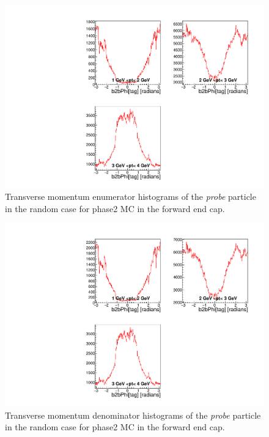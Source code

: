 \documentclass[a4paper,11pt,twosided,final,german,openbib,pdftex,listof=totoc,bibliography=totoc]{scrbook}
\begin{document}
\begin{appendix}
\begin{figure}[!htbp]
	\centering
	\includegraphics[width=\textwidth]{Plots/master/xPtMPhiRandomFCE_MC}
	\caption[Transverse Momentum $\phi$ Random Forward End Cap Enumerator Histogram Phase2 MC]{Transverse momentum enumerator histograms of the \textit{probe} particle in the random case for phase2 MC in the forward end cap.}
	\label{plt:PtMPhiRandomFCE_MC}
\end{figure}

\begin{figure}[!htbp]
	\centering
	\includegraphics[width=\textwidth]{Plots/master/xPtMPhiRandomFCD_MC}
	\caption[Transverse Momentum $\phi$ Random Forward End Cap Denominator Histogram Phase2 MC]{Transverse momentum denominator histograms of the \textit{probe} particle in the random case for phase2 MC in the forward end cap.}
	\label{plt:PtMPhiRandomFCD_MC}
\end{figure}



\end{appendix}
\end{document}
